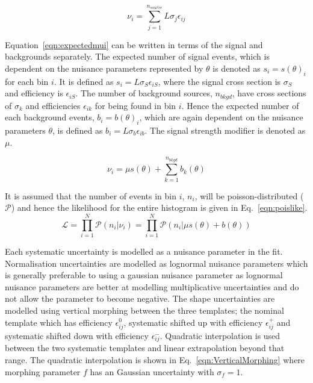 \begin{equation}
\nu_{i} = \sum_{j=1}^{n_{source}}L\sigma_{j}\epsilon_{ij}
\label{eqn:expectedmui}
\end{equation}

Equation~\ref{eqn:expectedmui} can be written in terms of the signal and backgrounds separately. The expected number of signal events, which is dependent on the nuisance parameters represented by $\theta$ is denoted as $s_i=s(\theta)_i$ for each bin $i$. It is defined as $s_i = L \sigma_{S} \epsilon_{iS}$, where the signal cross section is $\sigma_{S}$ and efficiency is $\epsilon_{iS}$. The number of background sources, $n_{bkgd}$, have cross sections of $\sigma_{k}$ and efficiencies $\epsilon_{ik}$ for being found in bin $i$. Hence the expected number of each background events, $b_i=b(\theta)_i$, which are again dependent on the nuisance parameters $\theta$, is defined as $b_i = L \sigma_{b} \epsilon_{ib}$. The signal strength modifier is denoted as $\mu$.

\begin{equation}
\nu_{i} = \mu s(\theta) + \sum_{k=1}^{n_{bkgd}}b_k(\theta)
\label{eqn:expectedmui2}
\end{equation}

It is assumed that the number of events in bin $i$, $n_{i}$, will be poisson-distributed ($\mathcal{P}$) and hence the likelihood for the entire histogram is given in Eq.~\ref{eqn:poislike}.
\begin{equation}
\mathcal{L} = \prod_{i=1}^{N} \mathcal{P}\left(n_{i}|\nu_{i}\right) = \prod_{i=1}^{N} \mathcal{P}\left(n_{i}|\mu s\left(\theta\right)+b\left(\theta\right) \right)
\label{eqn:poislike}
\end{equation}

Each systematic uncertainty is modelled as a nuisance parameter in the fit. Normalisation uncertainties are modelled as lognormal nuisance parameters which is generally preferable to using a gaussian nuisance parameter as lognormal nuisance parameters are better at modelling multiplicative uncertainties and do not allow the parameter to become negative. The shape uncertainties are modelled using vertical morphing between the three templates; the nominal template which has efficiency $\epsilon_{ij}^{0}$, systematic shifted up with efficiency $\epsilon_{ij}^{+}$ and systematic shifted down with efficiency $\epsilon_{ij}^{-}$. Quadratic interpolation is used between the two systematic templates and linear extrapolation beyond that range. The quadratic interpolation is shown in Eq.~\ref{eqn:VerticalMorphing} where morphing parameter $f$ has an Gaussian uncertainty with $\sigma_{f}=1$.

